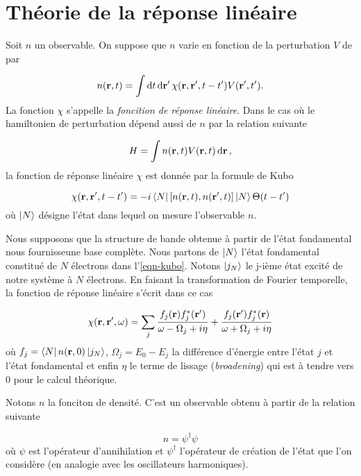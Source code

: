 \chapter{Théorie de la réponse linéaire}\label{chap-TRL}
Soit $n$ un observable. On suppose que $n$ varie en fonction de la perturbation $V$ de par

\begin{equation*}
  n(\vb{r}, t) = \int \dd{t} \dd{\vb{r'}}  \chi (\vb{r}, \vb{r}', t-t') V(\vb{r}', t').
\end{equation*}
La fonction $\chi$ s'appelle la \textit{foncition de réponse linéaire}.
Dans le cas où le hamiltonien de perturbation dépend aussi de $n$ par la relation suivante

\begin{equation*}
  H = \int n(\vb{r}, t) V(\vb{r}, t) \dd{\vb{r}},
\end{equation*}
la fonction de réponse linéaire $\chi$ est donnée par la formule de Kubo~\cite{Abrikosov1963}

\begin{equation}\label{eqn-kubo}
  \chi (\vb{r}, \vb{r}', t-t') = -i \bra{N} \comm{n(\vb{r}, t)}{n(\vb{r}', t)} \ket{N} \Theta(t-t')
\end{equation}
où $\ket{N}$ désigne l'état dans lequel on mesure l'observable $n$.

Nous supposons que la structure de bande obtenue
à partir de l'état fondamental nous fournisseune base complète.
Nous partons de $\ket{N}$ l'état fondamental constitué de $N$ électrons dans l'\cref{eqn-kubo}.
Notons $\ket{j_N}$ le j-ième état excité de notre système à $N$ électrons.
En faisant la transformation de Fourier temporelle,
la fonction de réponse linéaire s'écrit dans ce cas

\begin{equation}
 \chi (\vb{r}, \vb{r}', \omega) = \sum_j \frac{f_j(\vb{r}) f_j^*(\vb{r}') }{\omega - \Omega_j + i \eta} + \frac{f_j(\vb{r}') f_j^*(\vb{r}) }{\omega + \Omega_j + i \eta}
\end{equation}
où $f_j = \bra{N}n(\vb{r}, 0)\ket{j_N}$, $\Omega_j = E_0 - E_j$ la différence d'énergie
entre l'état $j$ et l'état fondamental et enfin $\eta$ le terme de lissage (\textit{broadening})
qui est à tendre vers 0 pour le calcul théorique.

Notons $n$ la fonciton de densité. C'est un observable obtenu à partir de la relation suivante

\begin{equation*}
n = \psi^\dagger \psi
\end{equation*}
où $\psi$ est l'opérateur d'annihilation et $\psi^\dagger$ l'opérateur de création de l'état
que l'on considère (en analogie avec les oscillateurs harmoniques).

